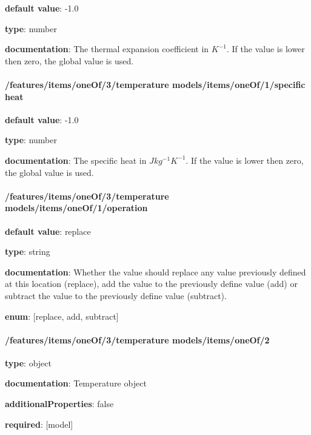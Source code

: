 \begin{itemized}
\item {\bf default value}: -1.0
\item {\bf type}: number
\item {\bf documentation}: The thermal expansion coefficient in $K^{-1}$. If the value is lower then zero, the global value is used.
\end{itemized}\paragraph{/features/items/oneOf/3/temperature models/items/oneOf/1/specific heat} \begin{itemized}
\item {\bf default value}: -1.0
\item {\bf type}: number
\item {\bf documentation}: The specific heat in $J kg^{-1} K^{-1}$. If the value is lower then zero, the global value is used.
\end{itemized}\paragraph{/features/items/oneOf/3/temperature models/items/oneOf/1/operation} \begin{itemized}
\item {\bf default value}: replace
\item {\bf type}: string
\item {\bf documentation}: Whether the value should replace any value previously defined at this location (replace), add the value to the previously define value (add) or subtract the value to the previously define value (subtract).
\item {\bf enum}: [replace, add, subtract]\end{itemized}\paragraph{/features/items/oneOf/3/temperature models/items/oneOf/2} \begin{itemized}
\item {\bf type}: object
\item {\bf documentation}: Temperature object
\item {\bf additionalProperties}: false
\item {\bf required}: [model]\end{itemized}
